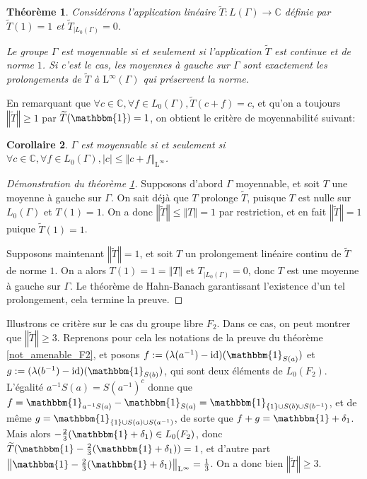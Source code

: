 \documentclass[a4paper,12pt]{article}
\newtheorem{theorem}{Théorème}[section]
\newtheorem{corollary}[theorem]{Corollaire}
\newcommand{\C}{\mathbb{C}}
\newcommand{\norm}[1]{\left\Vert #1\right\Vert}
\newcommand{\abs}[1]{\left\vert#1\right\vert}
\newcommand{\set}[1]{\left\{ #1 \right\}}
\newcommand{\indic}{\mathbbm{1}}
\newcommand{\ssi}{si et seulement si }
\newcommand{\inv}{^{-1}}
\newcommand{\compl}{^c}
\DeclareMathOperator{\id}{id}
\begin{document}
\begin{theorem}\label{left_mean_iff}
    Considérons l'application linéaire $\widetilde{T} : L(\Gamma)\to\C$ définie par $\widetilde{T}(1) = 1$
    et $\widetilde{T}_{|L_0(\Gamma)} = 0$. 
    
    Le groupe $\Gamma$ est moyennable \ssi l'application $\widetilde{T}$ est continue et de norme $1$.
    Si c'est le cas, les moyennes à gauche sur $\Gamma$ sont exactement les prolongements de $\widetilde{T}$ à 
    $\mathrm{L}^\infty(\Gamma)$ qui préservent la norme.
\end{theorem}

En remarquant que $\forall c\in\C, \forall f\in L_0(\Gamma), \widetilde{T}(c + f) = c$, et qu'on a toujours 
$\norm{\widetilde{T}}\ge1$ par $\widetilde{T}(\indic) = 1$, on obtient le critère de moyennabilité suivant:

\begin{corollary}\label{amenable_iff_L0}
    $\Gamma$ est moyennable \ssi $\forall c\in\C, \forall f\in L_0(\Gamma), \abs{c}\le\norm{c + f}_{\mathrm{L}^\infty}$.
\end{corollary}

\begin{proof}[Démonstration du théorème \ref{left_mean_iff}]
    Supposons d'abord $\Gamma$ moyennable, et soit $T$ une moyenne à gauche sur $\Gamma$.
    On sait déjà que $T$ prolonge $\widetilde{T}$, puisque $T$ est nulle sur $L_0(\Gamma)$ et 
    $T(1)=1$. On a donc $\norm{\widetilde{T}}\le\norm{T}=1$ par restriction, et en fait $\norm{\widetilde{T}} = 1$
    puique $\widetilde{T}(1)=1$. 

    Supposons maintenant $\norm{\widetilde{T}}=1$, et soit $T$ un prolongement linéaire continu de $\widetilde{T}$ de norme $1$.
    On a alors $T(1)=1=\norm{T}$ et $T_{|L_0(\Gamma)} = 0$, donc $T$ est une moyenne à gauche sur $\Gamma$. Le théorème de Hahn-Banach
    garantissant l'existence d'un tel prolongement, cela termine la preuve.
\end{proof}

Illustrons ce critère sur le cas du groupe libre $F_2$. Dans ce cas, on peut montrer que $\norm{\widetilde{T}}\ge3$.
Reprenons pour cela les notations de la preuve du théorème \ref{not_amenable_F2}, et posons $f := (\lambda(a\inv)-\id)(\indic_{S(a)})$ et 
$g:=(\lambda(b\inv) - \id)(\indic_{S(b)})$, qui sont deux éléments de $L_0(F_2)$. L'égalité $a\inv S(a) = S(a\inv)\compl$ donne que 
$f = \indic_{a\inv S(a)} - \indic_{S(a)} = \indic_{\set{1}\cup S(b)\cup S(b\inv)}$, et de même 
$g = \indic_{\set{1}\cup S(a)\cup S(a\inv)}$, de sorte que $f+g=\indic + \delta_1$. Mais alors 
$-\frac23(\indic+\delta_1)\in L_0(F_2)$, donc $\widetilde{T}(\indic - \frac23(\indic+\delta_1)) = 1$, 
et d'autre part $\norm{\indic - \frac23(\indic+\delta_1)}_{\mathrm{L}^\infty}=\frac13$. 
On a donc bien $\norm{\widetilde{T}}\geq3$.
\end{document}
